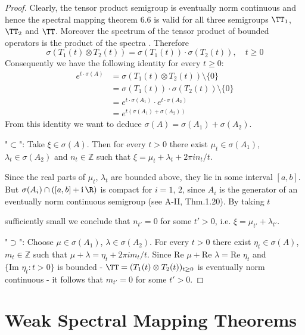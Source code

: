 \begin{proof}
Clearly, the tensor product semigroup is eventually norm continuous and hence the spectral mapping theorem 6.6 is valid for all three semigroups $\TT_{1}$, $\TT_{2}$ and $\TT$.
Moreover the spectrum of the tensor product of bounded operators is the product of the spectra \citet[XIII.9]{reedsimon:1978}.
Therefore
\[
\sigma(T_{1}(t)\otimes T_{2}(t)) = \sigma(T_{1}(t))\cdot\sigma(T_{2}(t)), \quad t \geq 0
\]
Consequently we have the following identity for every $t \geq 0$:
\begin{align*}
e^{t\cdot\sigma(A)} &= \sigma(T_{1}(t)\otimes T_{2}(t)) \setminus \{0\} \\
&= \sigma(T_{1}(t))\cdot\sigma(T_{2}(t)) \setminus \{0\} \\
&= e^{t\cdot\sigma(A_{1})}\cdot e^{t\cdot\sigma(A_{2})} \\
&= e^{t(\sigma(A_{1})+\sigma(A_{2}))}
\end{align*}
From this identity we want to deduce $\sigma(A) = \sigma(A_{1}) + \sigma(A_{2})$.

"$\subset$": Take $\xi \in \sigma(A)$.
Then for every $t > 0$ there exist $\mu_{t} \in \sigma(A_{1})$, $\lambda_{t} \in \sigma(A_{2})$ and $n_{t} \in \mathbb{Z}$ such that $\xi = \mu_{t} + \lambda_{t} + 2\pi i n_{t}/t$.

Since the real parts of $\mu_{t}$, $\lambda_{t}$ are bounded above, they lie in some interval $[a,b]$.
But $\sigma(A_{i}) \cap ([a,b] + \mathrm{i}\,\R)$ is compact for $i = 1$, $2$, since $A_{i}$ is the generator of an eventually norm continuous semigroup (see A-II, Thm.1.20).
By taking $t$

\newpage
sufficiently small we conclude that $n_{t'} = 0$ for some $t' > 0$, i.e. $\xi = \mu_{t'} + \lambda_{t'}$.

"$\supset$": Choose $\mu \in \sigma(A_{1})$, $\lambda \in \sigma(A_{2})$.
For every $t > 0$ there exist $\eta_{t} \in \sigma(A)$, $m_{t} \in \mathbb{Z}$ such that $\mu + \lambda = \eta_{t} + 2\pi i m_{t}/t$.
Since $\text{Re }\mu + \text{Re }\lambda = \text{Re }\eta_{t}$ and $\{\text{Im }\eta_{t}: t > 0\}$ is bounded - $\TT = (T_{1}(t) \otimes T_{2}(t))_{t\geq 0}$ is eventually norm continuous - it follows that $m_{t'} = 0$ for some $t' > 0$.
\end{proof}

\section{Weak Spectral Mapping Theorems}\label{sec:a3-7}

